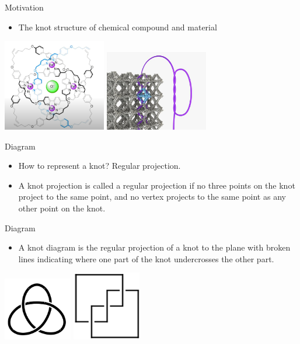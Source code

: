 \documentclass[]{beamer}
\begin{document}
\begin{frame}{Motivation}
\begin{itemize}
    \item The knot structure of chemical compound and material
\end{itemize}
\centering
\includegraphics[width = 4.5cm]{Pictures/chemical.png}
\includegraphics[width=4.5cm]{Pictures/material.jpg}
\end{frame}

\begin{frame}{Diagram}
\begin{itemize}
    \item How to represent a knot? Regular projection.
\end{itemize}
\begin{itemize}
    \item A knot projection is called a regular projection if no three points on the knot project to the same point, and no vertex
projects to the same point as any other point on the knot.
\end{itemize}
\end{frame}

\begin{frame}{Diagram}

\begin{itemize}
    \item A knot diagram is the regular projection of a knot to the plane with broken
lines indicating where one part of the knot undercrosses the other part.
\end{itemize}
\centering
\includegraphics[width=3cm]{Pictures/trefoil.png}
\includegraphics[width=3cm]{Pictures/31.png}
\end{frame}
\end{document}

